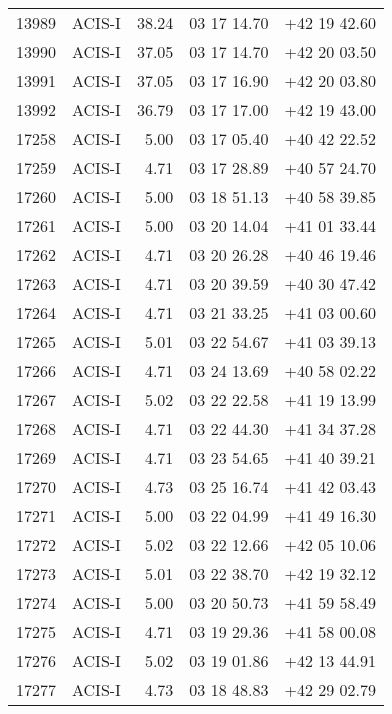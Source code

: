 \begin{supertabular}{rlrll}
  13989 &     ACIS-I &          38.24 & 03 17 14.70 & +42 19 42.60 \\
  13990 &     ACIS-I &          37.05 & 03 17 14.70 & +42 20 03.50 \\
  13991 &     ACIS-I &          37.05 & 03 17 16.90 & +42 20 03.80 \\
  13992 &     ACIS-I &          36.79 & 03 17 17.00 & +42 19 43.00 \\
  17258 &     ACIS-I &           5.00 & 03 17 05.40 & +40 42 22.52 \\
  17259 &     ACIS-I &           4.71 & 03 17 28.89 & +40 57 24.70 \\
  17260 &     ACIS-I &           5.00 & 03 18 51.13 & +40 58 39.85 \\
  17261 &     ACIS-I &           5.00 & 03 20 14.04 & +41 01 33.44 \\
  17262 &     ACIS-I &           4.71 & 03 20 26.28 & +40 46 19.46 \\
  17263 &     ACIS-I &           4.71 & 03 20 39.59 & +40 30 47.42 \\
  17264 &     ACIS-I &           4.71 & 03 21 33.25 & +41 03 00.60 \\
  17265 &     ACIS-I &           5.01 & 03 22 54.67 & +41 03 39.13 \\
  17266 &     ACIS-I &           4.71 & 03 24 13.69 & +40 58 02.22 \\
  17267 &     ACIS-I &           5.02 & 03 22 22.58 & +41 19 13.99 \\
  17268 &     ACIS-I &           4.71 & 03 22 44.30 & +41 34 37.28 \\
  17269 &     ACIS-I &           4.71 & 03 23 54.65 & +41 40 39.21 \\
  17270 &     ACIS-I &           4.73 & 03 25 16.74 & +41 42 03.43 \\
  17271 &     ACIS-I &           5.00 & 03 22 04.99 & +41 49 16.30 \\
  17272 &     ACIS-I &           5.02 & 03 22 12.66 & +42 05 10.06 \\
  17273 &     ACIS-I &           5.01 & 03 22 38.70 & +42 19 32.12 \\
  17274 &     ACIS-I &           5.00 & 03 20 50.73 & +41 59 58.49 \\
  17275 &     ACIS-I &           4.71 & 03 19 29.36 & +41 58 00.08 \\
  17276 &     ACIS-I &           5.02 & 03 19 01.86 & +42 13 44.91 \\
  17277 &     ACIS-I &           4.73 & 03 18 48.83 & +42 29 02.79 \\

\end{supertabular}
